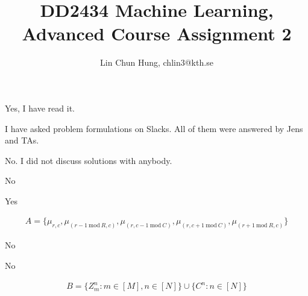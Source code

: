\documentclass[12pt]{article}
\newenvironment{problem}[2][Problem]{\begin{trivlist}
\item[\hskip \labelsep {\bfseries #1}\hskip \labelsep {\bfseries #2.}]}{\end{trivlist}}
\begin{document}
 
 
\title{DD2434 Machine Learning, Advanced Course Assignment 2}
\author{Lin Chun Hung, chlin3@kth.se}
\maketitle
\begin{problem}{2.1.1}
    Yes, I have read it.
\end{problem}
\begin{problem}{2.1.2}
    I have asked problem formulations on Slacks. All of them were answered by Jens
    and TAs.
\end{problem}
\begin{problem}{2.1.2}
    No. I did not discuss solutions with anybody.
\end{problem}
\begin{problem}{2.2.4}
    No
\end{problem}
\begin{problem}{2.2.5}
    Yes
\end{problem}
\begin{problem}{2.2.6}
\begin{align*}
    A = \{ \mu_{r,c}, 
            \mu_{(r-1 ~\text{mod}~ R,c)},
            \mu_{(r, c-1 ~\text{mod}~ C)},
            \mu_{(r, c+1 ~\text{mod}~ C)},
            \mu_{(r+1 ~\text{mod}~ R,c)}
        \}    
\end{align*}
\end{problem}
\begin{problem}{2.2.7}
    No
\end{problem}
\begin{problem}{2.2.8}
    No
\end{problem}
\begin{problem}{2.2.9}
\begin{align*}
    B = \{ Z^n_m: m \in [M], n \in [N]\} \cup \{ C^n: n \in [N]\}
\end{align*}
\end{problem}
\pagebreak
\end{document}
